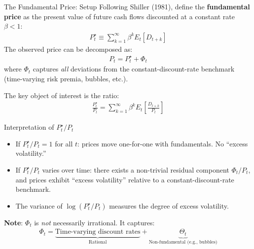 \documentclass{beamer}
\begin{document}
\begin{frame}{The Fundamental Price: Setup}
	Following Shiller (1981), define the \textbf{fundamental price} as the present value of future cash flows discounted at a constant rate $\beta < 1$:
	\begin{align}
		P_t^\star \equiv \sum_{k=1}^{\infty} \beta^k E_t\left[D_{t+k}\right] \label{equ:pstar}
	\end{align}
	The observed price can be decomposed as:
	\begin{align}
		P_t = P_t^\star + \Phi_t
	\end{align}
	where $\Phi_t$ captures \textit{all} deviations from the constant-discount-rate benchmark (time-varying risk premia, bubbles, etc.).

	\vspace{5pt}
	The key object of interest is the ratio:
	\begin{align}
		\frac{P_t^\star}{P_t} = \sum_{k=1}^{\infty} \beta^k E_t\left[\frac{D_{t+k}}{P_t}\right] \label{equ:pstar_ratio}
	\end{align}
\end{frame}

\begin{frame}{Interpretation of $P^\star_t / P_t$}
	\begin{itemize}
		\item If $P_t^\star / P_t = 1$ for all $t$: prices move one-for-one with fundamentals. No ``excess volatility.''
		\item If $P_t^\star / P_t$ varies over time: there exists a non-trivial residual component $\Phi_t / P_t$, and prices exhibit ``excess volatility'' relative to a constant-discount-rate benchmark.
		\item The variance of $\log(P_t^\star / P_t)$ measures the degree of excess volatility.
	\end{itemize}

	\vspace{5pt}
	\textbf{Note}: $\Phi_t$ is \textit{not} necessarily irrational. It captures:
	\begin{align*}
		\Phi_t = \underbrace{\text{Time-varying discount rates}}_{\text{Rational}} + \underbrace{\Theta_t}_{\text{Non-fundamental (e.g., bubbles)}}
	\end{align*}
\end{frame}
\end{document}
